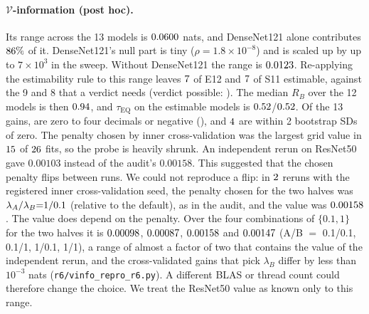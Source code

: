 \documentclass[10pt]{article}
\begin{document}
\paragraph{$\mathcal{V}$-information (post hoc).} Its range across the 13 models is $0.0600$ nats, and DenseNet121 alone contributes $86\%$ of it. DenseNet121's null part is tiny ($\rho{=}1.8{\times}10^{-8}$) and is scaled up by up to $7{\times}10^{3}$ in the sweep. Without DenseNet121 the range is $0.0123$. Re-applying the estimability rule to this range leaves $7$ of E12 and $7$ of S11 estimable, against the 9 and 8 that a verdict needs (verdict possible: \RPVinfoNoDVerdictPossible). The median $R_B$ over the 12 models is then $0.94$, and $\tau_{\mathrm{EQ}}$ on the estimable models is $0.52$/$0.52$. Of the 13 gains, \RPVinfoNonposw{} are zero to four decimals or negative (\RPVinfoNonposList), and $4$ are within 2 bootstrap SDs of zero. The penalty chosen by inner cross-validation was the largest grid value in $15$ of $26$ fits, so the probe is heavily shrunk. An independent rerun on ResNet50 gave $0.00103$ instead of the audit's $0.00158$. This suggested that the chosen penalty flips between runs. We could not reproduce a flip: in $2$ reruns with the registered inner cross-validation seed, the penalty chosen for the two halves was $\lambda_A/\lambda_B{=}1/0.1$ (relative to the default), as in the audit, and the value was $0.00158$. The value does depend on the penalty. Over the four combinations of $\{0.1,1\}$ for the two halves it is $0.00098$, $0.00087$, $0.00158$ and $0.00147$ (A/B ${=}$ 0.1/0.1, 0.1/1, 1/0.1, 1/1), a range of almost a factor of two that contains the value of the independent rerun, and the cross-validated gains that pick $\lambda_B$ differ by less than $10^{-3}$ nats (\texttt{r6/vinfo\_repro\_r6.py}). A different BLAS or thread count could therefore change the choice. We treat the ResNet50 value as known only to this range.
\end{document}
